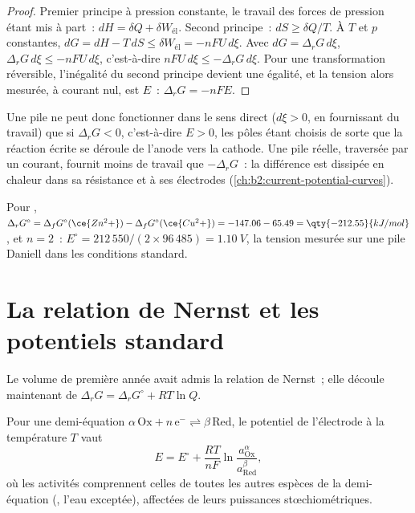 \begin{proof}
Premier principe à pression constante, le travail des forces de pression étant mis à part~:
$dH = \delta Q + \delta W_{\text{él}}$. Second principe~: $dS \geq \delta Q/T$. À
$T$ et $p$ constantes, $dG = dH - T\,dS \leq \delta W_{\text{él}} = -nFU\,d\xi$.
Avec $dG = \Delta_r G\,d\xi$, $\Delta_r G\,d\xi \leq -nFU\,d\xi$, c'est-à-dire
$nFU\,d\xi \leq -\Delta_r G\,d\xi$. Pour une transformation réversible, l'inégalité
du second principe devient une égalité, et la tension alors mesurée, à courant
nul, est $E$~: $\Delta_r G = -nFE$.
\end{proof}

Une pile ne peut donc fonctionner dans le sens direct ($d\xi > 0$, en fournissant du travail) que si $\Delta_r G <
0$, c'est-à-dire $E > 0$, les pôles étant choisis de sorte que la réaction écrite se déroule
de l'anode vers la cathode. Une pile réelle, traversée par un courant, fournit
moins de travail que $-\Delta_r G$~: la différence est dissipée en chaleur dans sa
résistance et à ses électrodes (\cref{ch:b2:current-potential-curves}).

\begin{example}\label{ex:b2:cell-thermodynamics:daniell}
Pour , $\Delta_r G^\circ = \Delta_f G^\circ(\ce{Zn^2+}) -
\Delta_f G^\circ(\ce{Cu^2+}) = -147.06 - 65.49 = \qty{-212.55}{kJ/mol}$, et $n = 2$~:
$E^\circ = 212\,550/(2 \times 96\,485) = \qty{1.10}{V}$, la tension mesurée sur une
pile Daniell dans les conditions standard.
\end{example}

\section{La relation de Nernst et les potentiels standard}

Le volume de première année avait admis la relation de Nernst~; elle découle maintenant de
$\Delta_r G = \Delta_r G^\circ + RT\ln Q$.

\begin{theorem}\label{thm:b2:cell-thermodynamics:nernst-derived}
Pour une demi-équation $\alpha\,\mathrm{Ox} + n\,\mathrm e^- \rightleftharpoons
\beta\,\mathrm{Red}$, le potentiel de l'électrode à la température $T$ vaut
\[
  E = E^\circ + \frac{RT}{nF}\ln\frac{a_{\mathrm{Ox}}^{\alpha}}{a_{\mathrm{Red}}^{\beta}} ,
\]
où les activités comprennent celles de toutes les autres espèces de la
demi-équation (, l'eau exceptée), affectées de leurs puissances stœchiométriques.
\end{theorem}

